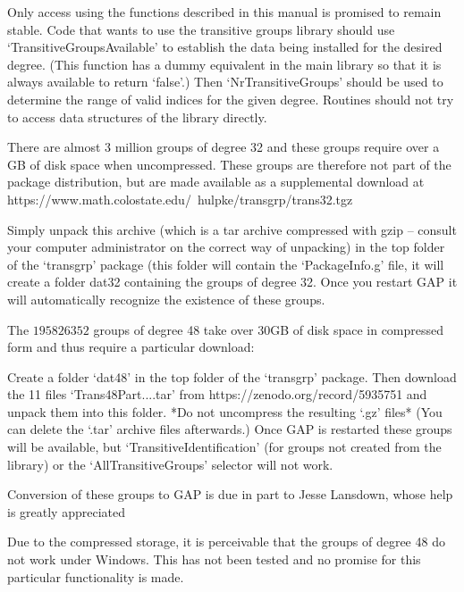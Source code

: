 
Only access using the functions described in this manual is promised to
remain stable. Code that wants to use the transitive groups library should
use `TransitiveGroupsAvailable' to establish the data being installed for
the desired degree. (This function has a dummy equivalent in the main {\GAP}
library so that it is always available to return `false'.) Then
`NrTransitiveGroups' should be used to determine the range of valid indices for
the given degree. Routines should not try to access data structures of the
library directly.


There are almost 3 million groups of degree 32 and these groups require over
a GB of disk space when uncompressed.
These groups are therefore not part of the package
distribution, but are made available as a supplemental download at 
\begintt
https://www.math.colostate.edu/~hulpke/transgrp/trans32.tgz
\endtt

Simply unpack this archive (which is a tar archive compressed with gzip --
consult your computer administrator on the correct way of unpacking)
in the top folder of the `transgrp' package (this
folder will contain the `PackageInfo.g' file, it will create a folder dat32
containing the groups of degree 32. Once you restart GAP it will
automatically recognize the existence of these groups.

The $195826352$ groups of degree 48 take over 30GB of disk space in
compressed form and thus require a particular download:

Create a folder `dat48' in the top folder of the `transgrp' package. Then
download the 11 files `Trans48Part....tar' from
\begintt
https://zenodo.org/record/5935751
\endtt
and unpack them into this folder. 
*Do not uncompress the resulting `.gz' files*
(You can delete the `.tar' archive files afterwards.)
Once GAP is restarted these groups will be available, but
`TransitiveIdentification' (for groups not created from the library) or
the `AllTransitiveGroups' selector will not work.

Conversion of these groups to GAP is due in part to Jesse Lansdown, whose
help is greatly appreciated

Due to the compressed storage, it is perceivable that the groups of degree 48
do not work under Windows. This has not been tested and no promise for this
particular functionality is made.
